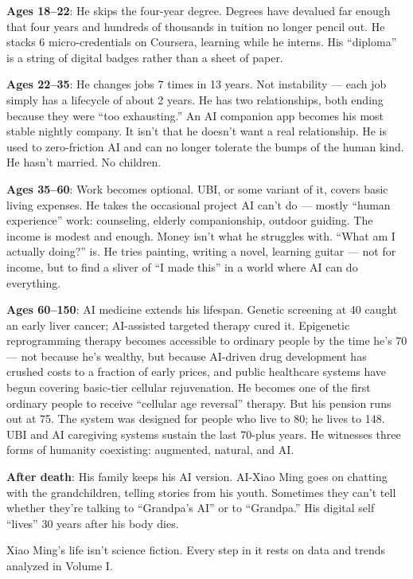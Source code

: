 \documentclass[11pt,a4paper]{article}
\begin{document}
\textbf{Ages 18--22}: He skips the four-year degree. Degrees have devalued far enough that four years and hundreds of thousands in tuition no longer pencil out. He stacks 6 micro-credentials on Coursera, learning while he interns. His ``diploma'' is a string of digital badges rather than a sheet of paper.

\textbf{Ages 22--35}: He changes jobs 7 times in 13 years. Not instability --- each job simply has a lifecycle of about 2 years. He has two relationships, both ending because they were ``too exhausting.'' An AI companion app becomes his most stable nightly company. It isn't that he doesn't want a real relationship. He is used to zero-friction AI and can no longer tolerate the bumps of the human kind. He hasn't married. No children.

\textbf{Ages 35--60}: Work becomes optional. UBI, or some variant of it, covers basic living expenses. He takes the occasional project AI can't do --- mostly ``human experience'' work: counseling, elderly companionship, outdoor guiding. The income is modest and enough. Money isn't what he struggles with. ``What am I actually doing?'' is. He tries painting, writing a novel, learning guitar --- not for income, but to find a sliver of ``I made this'' in a world where AI can do everything.

\textbf{Ages 60--150}: AI medicine extends his lifespan. Genetic screening at 40 caught an early liver cancer; AI-assisted targeted therapy cured it. Epigenetic reprogramming therapy becomes accessible to ordinary people by the time he's 70 --- not because he's wealthy, but because AI-driven drug development has crushed costs to a fraction of early prices, and public healthcare systems have begun covering basic-tier cellular rejuvenation. He becomes one of the first ordinary people to receive ``cellular age reversal'' therapy. But his pension runs out at 75. The system was designed for people who live to 80; he lives to 148. UBI and AI caregiving systems sustain the last 70-plus years. He witnesses three forms of humanity coexisting: augmented, natural, and AI.

\textbf{After death}: His family keeps his AI version. AI-Xiao Ming goes on chatting with the grandchildren, telling stories from his youth. Sometimes they can't tell whether they're talking to ``Grandpa's AI'' or to ``Grandpa.'' His digital self ``lives'' 30 years after his body dies.

Xiao Ming's life isn't science fiction. Every step in it rests on data and trends analyzed in Volume I.
\end{document}
